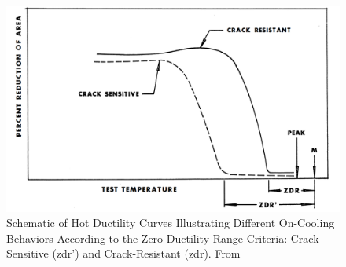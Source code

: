 \begin{figure}
\centering
\includegraphics[width=6in]{figures/zdr-schematic.png}
\caption[Schematic of Hot Ductility Curves Illustrating Different On-Cooling Behaviors According to the Zero Ductility Range Criteria.]{Schematic of Hot Ductility Curves Illustrating Different On-Cooling Behaviors According to the Zero Ductility Range Criteria: Crack-Sensitive (\gls{zdr}') and Crack-Resistant (\gls{zdr}).  From \citet[Fig.~4]{yeniscavich_correlation_1970}}
\label{fig:zdr-schematic}
\end{figure}


